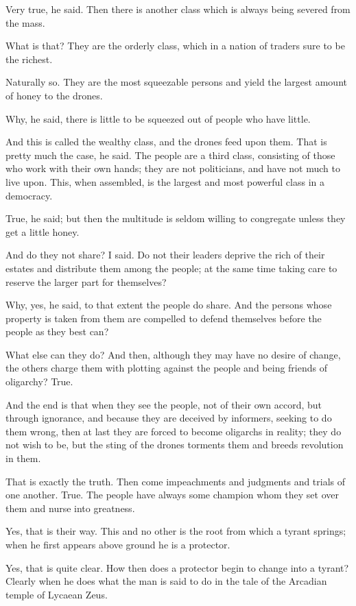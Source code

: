 Very true, he said.
Then there is another class which is always being severed from the mass.

What is that?
They are the orderly class, which in a nation of traders sure to be the richest.

Naturally so.
They are the most squeezable persons and yield the largest amount of honey to the drones.

Why, he said, there is little to be squeezed out of people who have little.

And this is called the wealthy class, and the drones feed upon them.
That is pretty much the case, he said.
The people are a third class, consisting of those who work with their own hands; they are not politicians, and have not much to live upon. This, when assembled, is the largest and most powerful class in a democracy.

True, he said; but then the multitude is seldom willing to congregate unless they get a little honey.

And do they not share? I said. Do not their leaders deprive the rich of their estates and distribute them among the people; at the same time taking care to reserve the larger part for themselves?

Why, yes, he said, to that extent the people do share.
And the persons whose property is taken from them are compelled to defend themselves before the people as they best can?

What else can they do?
And then, although they may have no desire of change, the others charge them with plotting against the people and being friends of oligarchy? True.

And the end is that when they see the people, not of their own accord, but through ignorance, and because they are deceived by informers, seeking to do them wrong, then at last they are forced to become oligarchs in reality; they do not wish to be, but the sting of the drones torments them and breeds revolution in them.

That is exactly the truth.
Then come impeachments and judgments and trials of one another.
True.
The people have always some champion whom they set over them and nurse into greatness.

Yes, that is their way.
This and no other is the root from which a tyrant springs; when he first appears above ground he is a protector.

Yes, that is quite clear.
How then does a protector begin to change into a tyrant? Clearly when he does what the man is said to do in the tale of the Arcadian temple of Lycaean Zeus.

